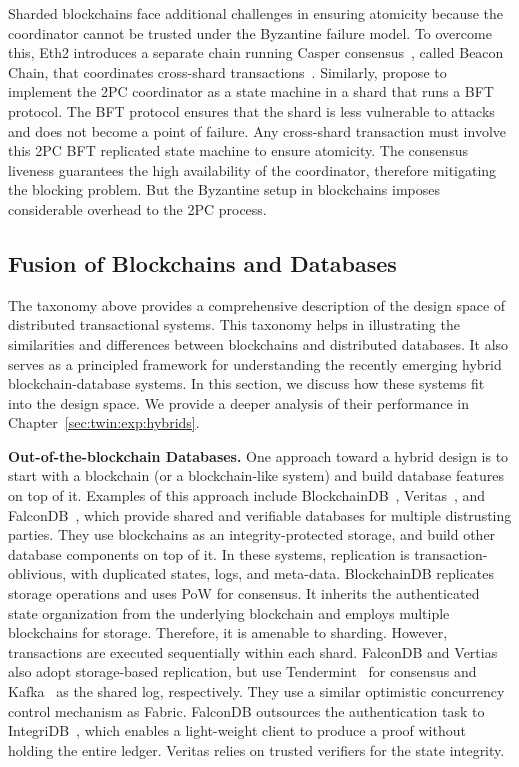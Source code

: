 Sharded blockchains face additional challenges in ensuring atomicity because the
coordinator cannot be trusted under the Byzantine failure model.
To overcome this, Eth2 introduces a separate chain running Casper
consensus~\cite{buterin2017casper}, called Beacon Chain, that coordinates
cross-shard transactions~\cite{web:eth2}.
Similarly, \cite{dang2018towards,herlihy2019cross} propose to implement the 2PC
coordinator as a state machine in a shard that runs a BFT protocol. The BFT
protocol ensures that the shard is less vulnerable to attacks and does not
become a point of failure.
Any cross-shard transaction must involve this 2PC BFT replicated state machine
to ensure atomicity.
The consensus liveness guarantees the high availability of the coordinator,
therefore mitigating the blocking problem.
But the Byzantine setup in blockchains imposes considerable overhead to the 2PC
process.

\subsection{Fusion of Blockchains and Databases}
The taxonomy above provides a comprehensive description of the design space of
distributed transactional systems. This taxonomy helps in illustrating the
similarities and differences between blockchains and distributed databases. It
also serves as a principled framework for understanding the recently emerging
hybrid blockchain-database systems. In this section, we discuss how these
systems fit into the design space. We provide a deeper analysis of their
performance in Chapter~\ref{sec:twin:exp:hybrids}.

\textbf{Out-of-the-blockchain Databases.} One approach toward a hybrid design is
to start with a blockchain (or a blockchain-like system) and build database
features on top of it. Examples of this approach include
BlockchainDB~\cite{el2019blockchaindb}, Veritas~\cite{veritas}, and
FalconDB~\cite{peng2020falcondb}, which provide shared and verifiable databases
for multiple distrusting parties.
They use blockchains as an integrity-protected storage, and build other database
components on top of it.
In these systems, replication is transaction-oblivious, with duplicated states,
logs, and meta-data.
BlockchainDB replicates storage operations and uses PoW for
consensus. It inherits the authenticated state organization from the underlying
blockchain and employs multiple blockchains for storage. Therefore, it is
amenable to sharding. However, transactions are executed sequentially within
each shard.
FalconDB and Vertias also adopt storage-based replication, but use
Tendermint~\cite{buchman2016tendermint} for consensus and Kafka~\cite{web:kafka}
as the shared log, respectively.
They use a similar optimistic concurrency control mechanism as Fabric. FalconDB
outsources the authentication task to IntegriDB~\cite{zhang2015integridb}, which
enables a light-weight client to produce a proof without holding the entire
ledger. Veritas relies on trusted verifiers for the state integrity.

